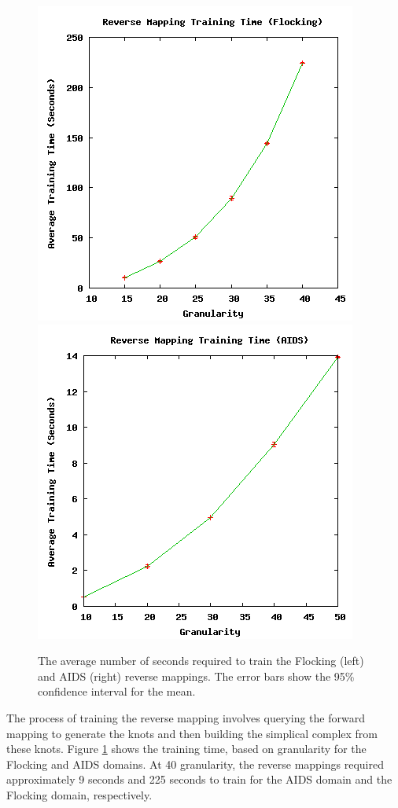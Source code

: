 \begin{figure}[ht]
\centering
\includegraphics[scale=.5]{images/results_flocking/rmtraining.png}
\includegraphics[scale=.5]{images/results_aids/aids-rmtraining.png}
\caption{The average number of seconds required to train the Flocking (left) and AIDS (right) reverse mappings.
The error bars show the 95\% confidence interval for the mean.}
\label{fig:farmtraining}
\end{figure}



The process of training the reverse mapping involves querying the forward mapping to generate the knots and then building the simplical complex from these knots.
Figure \ref{fig:farmtraining} shows the training time, based on granularity for the Flocking and AIDS domains.
At 40 granularity, the reverse mappings required approximately 9 seconds and 225 seconds to train for the AIDS domain and the Flocking domain, respectively.

